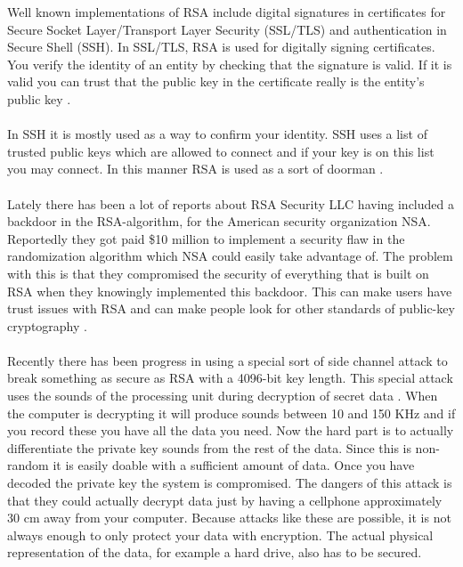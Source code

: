 \documentclass[frame, english]{idamasterthesis}
\begin{document}
\noindent
Well known implementations of RSA include digital signatures in certificates for Secure Socket Layer/Transport Layer Security (SSL/TLS) and authentication in Secure Shell (SSH). In SSL/TLS, RSA is used for digitally signing certificates. You verify the identity of an entity by checking that the signature is valid. If it is valid you can trust that the public key in the certificate really is the entity's public key \cite{ssl}.\\\\
In SSH it is mostly used as a way to confirm your identity. SSH uses a list of trusted public keys which are allowed to connect and if your key is on this list you may connect. In this manner RSA is used as a sort of doorman \cite{ssh}.\\\\
Lately there has been a lot of reports about RSA Security LLC having included a backdoor in the RSA-algorithm, for the American security organization NSA. Reportedly they got paid \$10 million to implement a security flaw in the randomization algorithm which NSA could easily take advantage of. The problem with this is that they compromised the security of everything that is built on RSA when they knowingly implemented this backdoor. This can make users have trust issues with RSA and can make people look for other standards of public-key cryptography \cite{nsabackdoor}.\\\\
Recently there has been progress in using a special sort of side channel attack to break something as secure as RSA with a 4096-bit key length. This special attack uses the sounds of the processing unit during decryption of secret data \cite{rsasound}. When the computer is decrypting it will produce sounds between 10 and 150 KHz and if you record these you have all the data you need. Now the hard part is to actually differentiate the private key sounds from the rest of the data. Since this is non-random it is easily doable with a sufficient amount of data. Once you have decoded the private key the system is compromised. The dangers of this attack is that they could actually decrypt data just by having a cellphone approximately 30 cm away from your computer. Because attacks like these are possible, it is not always enough to only protect your data with encryption. The actual physical representation of the data, for example a hard drive, also has to be secured.

\end{document}
